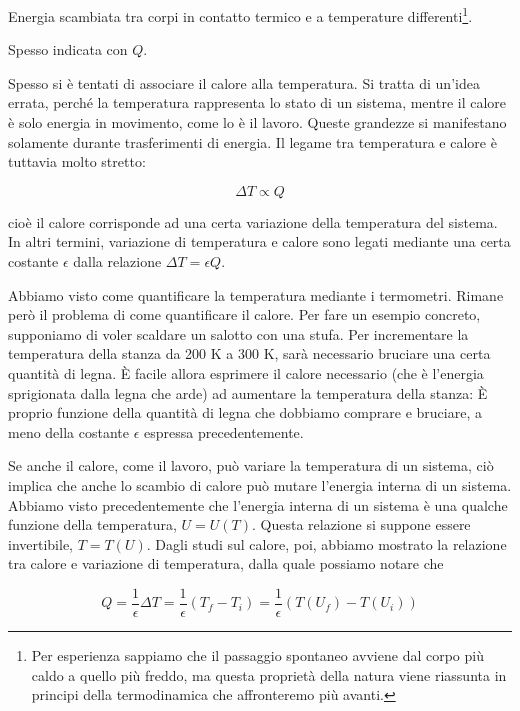 \begin{tcolorbox}[colback = red!30, colframe = red!30!black, title = {Calore}]
Energia scambiata tra corpi in contatto termico e a temperature
differenti\footnote{Per esperienza sappiamo che il passaggio spontaneo avviene
dal corpo più caldo a quello più freddo, ma questa proprietà della natura viene riassunta in principi della termodinamica che affronteremo più avanti.}.

Spesso indicata con $Q$.
\end{tcolorbox}

Spesso si è tentati di associare il calore alla temperatura. Si
tratta di un'idea errata, perché la temperatura rappresenta lo
stato di un sistema, mentre il calore è solo energia in movimento,
come lo è il lavoro. Queste grandezze si manifestano solamente
durante trasferimenti di energia. Il legame tra temperatura e calore
è tuttavia molto stretto:

\[ \Delta T \propto Q \]

\noindent cioè il calore corrisponde ad una certa variazione della temperatura
del sistema. In altri termini, variazione di temperatura e calore sono legati
mediante una certa costante $\epsilon$ dalla relazione $\Delta T = \epsilon Q$.

Abbiamo visto come quantificare la temperatura mediante i termometri. Rimane
però il problema di come quantificare il calore. Per fare un
esempio concreto, supponiamo di voler scaldare un salotto con una stufa. Per
incrementare la temperatura della stanza da 200 K a 300 K, sarà necessario
bruciare una certa quantità di legna. È facile allora esprimere il calore
necessario (che è l'energia sprigionata dalla legna che arde) ad aumentare
la temperatura della stanza: È proprio funzione della quantità di legna che dobbiamo
comprare e bruciare, a meno della costante $\epsilon$ espressa precedentemente.

Se anche il calore, come il lavoro, può variare la temperatura di un sistema,
ciò implica che anche lo scambio di calore può mutare l'energia interna di
un sistema.
Abbiamo visto precedentemente che l'energia interna di un sistema è una qualche
funzione della temperatura, $U = U(T)$. Questa relazione si suppone essere
invertibile, $T = T(U)$. Dagli studi sul calore, poi, abbiamo mostrato la
relazione tra calore e variazione di temperatura, dalla quale possiamo notare
che

\[ Q = \frac{1}{\epsilon}\Delta T = \frac{1}{\epsilon}(T_f - T_i) = \frac{1}{\epsilon}(T(U_f) - T(U_i)) \]

